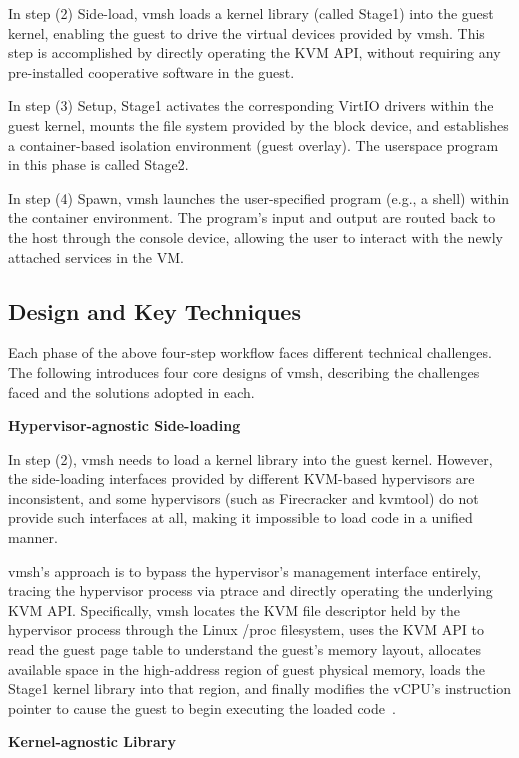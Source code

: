 \begin{ZhChapter}
In step (2) Side-load, vmsh loads a kernel library (called Stage1) into the guest kernel, enabling the guest to drive the virtual devices provided by vmsh. This step is accomplished by directly operating the KVM API, without requiring any pre-installed cooperative software in the guest.

In step (3) Setup, Stage1 activates the corresponding VirtIO drivers within the guest kernel, mounts the file system provided by the block device, and establishes a container-based isolation environment (guest overlay). The userspace program in this phase is called Stage2.

In step (4) Spawn, vmsh launches the user-specified program (e.g., a shell) within the container environment. The program's input and output are routed back to the host through the console device, allowing the user to interact with the newly attached services in the VM.

\subsection{Design and Key Techniques}
\label{sec:vmsh-techniques}

Each phase of the above four-step workflow faces different technical challenges. The following introduces four core designs of vmsh, describing the challenges faced and the solutions adopted in each.

\noindent\textbf{Hypervisor-agnostic Side-loading}

In step (2), vmsh needs to load a kernel library into the guest kernel. However, the side-loading interfaces provided by different KVM-based hypervisors are inconsistent, and some hypervisors (such as Firecracker and kvmtool) do not provide such interfaces at all, making it impossible to load code in a unified manner.

vmsh's approach is to bypass the hypervisor's management interface entirely, tracing the hypervisor process via ptrace and directly operating the underlying KVM API. Specifically, vmsh locates the KVM file descriptor held by the hypervisor process through the Linux /proc filesystem, uses the KVM API to read the guest page table to understand the guest's memory layout, allocates available space in the high-address region of guest physical memory, loads the Stage1 kernel library into that region, and finally modifies the vCPU's instruction pointer to cause the guest to begin executing the loaded code~\cite{Thalheim2022}.

\noindent\textbf{Kernel-agnostic Library}


\end{ZhChapter}
